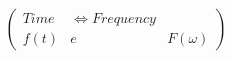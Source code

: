 \documentclass[preview]{standalone}
\begin{document}
\begin{align*}
\left( \begin{array}{cl} Time & \Longleftrightarrow Frequency \\ f(t) & e & F(\omega) \end{array} \right)
\end{align*}
\end{document}
